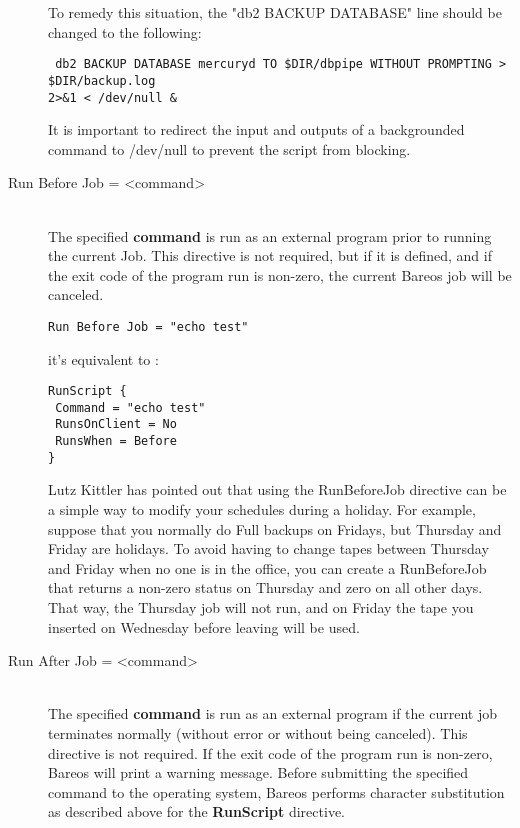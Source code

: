 \begin{description}
To remedy this situation, the "db2 BACKUP DATABASE" line should be changed to
the following:

\footnotesize
\begin{verbatim}
 db2 BACKUP DATABASE mercuryd TO $DIR/dbpipe WITHOUT PROMPTING > $DIR/backup.log
2>&1 < /dev/null &
\end{verbatim}
\normalsize

It is important to redirect the input and outputs of a backgrounded command to
/dev/null to prevent the script from blocking.

\item [Run Before Job = {\textless}command{\textgreater}] \hfill \\
The specified {\bf command} is run as an external program prior to running the
current Job.  This directive is not required, but if it is defined, and if the
exit code of the program run is non-zero, the current Bareos job will be
canceled.

\begin{verbatim}
Run Before Job = "echo test"
\end{verbatim}
   it's equivalent to :
\begin{verbatim}
RunScript {
 Command = "echo test"
 RunsOnClient = No
 RunsWhen = Before
}
\end{verbatim}

Lutz Kittler has pointed out that using the RunBeforeJob directive can be a
simple way to modify your schedules during a holiday.  For example, suppose
that you normally do Full backups on Fridays, but Thursday and Friday are
holidays.  To avoid having to change tapes between Thursday and Friday when
no one is in the office, you can create a RunBeforeJob that returns a
non-zero status on Thursday and zero on all other days.  That way, the
Thursday job will not run, and on Friday the tape you inserted on Wednesday
before leaving will be used.

\item [Run After Job = {\textless}command{\textgreater}] \hfill \\
The specified {\bf command} is run as an external program if the current
job terminates normally (without error or without being canceled).  This
directive is not required.  If the exit code of the program run is
non-zero, Bareos will print a warning message.  Before submitting the
specified command to the operating system, Bareos performs character
substitution as described above for the {\bf RunScript} directive.


\end{description}
